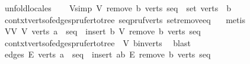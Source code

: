 \begin{isabellebody}
\ unfold{\isacharunderscore}{\kern0pt}locales\isanewline
\isanewline
\ \ \isamarkupfalse%
\ V{\isacharprime}{\kern0pt}{\isacharbrackleft}{\kern0pt}simp{\isacharbrackright}{\kern0pt}{\isacharcolon}{\kern0pt}\ {\isachardoublequoteopen}{\isacharquery}{\kern0pt}V\ {\isacharparenleft}{\kern0pt}remove{}\ b\ verts{\isacharparenright}{\kern0pt}\ seq\ {\isacharequal}{\kern0pt}\ set\ verts\ {\isacharminus}{\kern0pt}\ {\isacharbraceleft}{\kern0pt}b{\isacharbraceright}{\kern0pt}{\isachardoublequoteclose}\isanewline
\ \ \ \ \isamarkupfalse%
\ contxt{\isacharprime}{\kern0pt}{\isachardot}{\kern0pt}verts{\isacharunderscore}{\kern0pt}of{\isacharunderscore}{\kern0pt}edges{\isacharunderscore}{\kern0pt}prufer{\isacharunderscore}{\kern0pt}to{\isacharunderscore}{\kern0pt}tree\ seq{\isacharunderscore}{\kern0pt}pruf{\isacharunderscore}{\kern0pt}verts{\isacharprime}{\kern0pt}\ set{\isacharunderscore}{\kern0pt}remove{}{\isacharunderscore}{\kern0pt}eq\ {}{\isacharparenleft}{\kern0pt}{}{\isacharparenright}{\kern0pt}\ \isamarkupfalse%
\ metis\isanewline
\ \ \isamarkupfalse%
\ V{\isacharunderscore}{\kern0pt}V{\isacharprime}{\kern0pt}{\isacharcolon}{\kern0pt}\ {\isachardoublequoteopen}{\isacharquery}{\kern0pt}V\ verts\ {\isacharparenleft}{\kern0pt}a\ {\isacharhash}{\kern0pt}\ seq{\isacharparenright}{\kern0pt}\ {\isacharequal}{\kern0pt}\ insert\ b\ {\isacharparenleft}{\kern0pt}{\isacharquery}{\kern0pt}V\ {\isacharparenleft}{\kern0pt}remove{}\ b\ verts{\isacharparenright}{\kern0pt}\ seq{\isacharparenright}{\kern0pt}{\isachardoublequoteclose}\isanewline
\ \ \ \ \isamarkupfalse%
\ contxt{\isachardot}{\kern0pt}verts{\isacharunderscore}{\kern0pt}of{\isacharunderscore}{\kern0pt}edges{\isacharunderscore}{\kern0pt}prufer{\isacharunderscore}{\kern0pt}to{\isacharunderscore}{\kern0pt}tree\ {}\ V{\isacharprime}{\kern0pt}\ b{\isacharunderscore}{\kern0pt}in{\isacharunderscore}{\kern0pt}verts\ \isamarkupfalse%
\ blast\isanewline
\ \ \isamarkupfalse%
\ edges{\isacharcolon}{\kern0pt}\ {\isachardoublequoteopen}{\isacharquery}{\kern0pt}E\ verts\ {\isacharparenleft}{\kern0pt}a\ {\isacharhash}{\kern0pt}\ seq{\isacharparenright}{\kern0pt}\ {\isacharequal}{\kern0pt}\ insert\ {\isacharbraceleft}{\kern0pt}a{\isacharcomma}{\kern0pt}b{\isacharbraceright}{\kern0pt}\ {\isacharparenleft}{\kern0pt}{\isacharquery}{\kern0pt}E\ {\isacharparenleft}{\kern0pt}remove{}\ b\ verts{\isacharparenright}{\kern0pt}\ seq{\isacharparenright}{\kern0pt}{\isachardoublequoteclose}\isanewline

\end{isabellebody}
